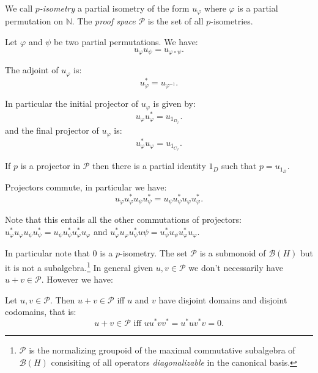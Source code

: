 \begin{definition}
We call \emph{$p$-isometry} a partial isometry of the form $u_\varphi$ where $\varphi$ is a partial permutation on $\mathbb{N}$. The \emph{proof space} $\mathcal{P}$ is the set of all $p$-isometries.
\end{definition}

\begin{proposition}
Let $\varphi$ and $\psi$ be two partial permutations. We have:
\begin{equation*}
u_\varphi u_\psi = u_{\varphi\circ\psi}.
\end{equation*}

The adjoint of $u_\varphi$ is:
\begin{equation*}
u_\varphi^* = u_{\varphi^{-1}}.
\end{equation*}

In particular the initial projector of $u_{\varphi}$ is given by:
\begin{equation*}
u_\varphi u^*_\varphi = u_{1_{D_\varphi}}.
\end{equation*}
and the final projector of $u_\varphi$ is:
\begin{equation*}
u^*_\varphi u_\varphi = u_{1_{C_\varphi}}.
\end{equation*}

If $p$ is a projector in $\mathcal{P}$ then there is a partial identity $1_D$ such that $p= u_{1_D}$.

Projectors commute, in particular we have:
\begin{equation*}
u_\varphi u_\varphi^*u_\psi u_\psi^* = u_\psi u_\psi^*u_\varphi u_\varphi^*.
\end{equation*}
\end{proposition}

Note that this entails all the other commutations of projectors:
\(u^*_\varphi u_\varphi u_\psi u^*_\psi = u_\psi u^*_\psi u^*_\varphi u_\varphi\)
and
\(u^*_\varphi u_\varphi u^*_\psi u\psi = u^*_\psi u_\psi u^*_\varphi u_\varphi\).

In particular note that \(0\) is a \(p\)-isometry. The set
\(\mathcal{P}\) is a submonoid of \(\mathcal{B}(H)\) but it is not a
subalgebra.\footnote{\(\mathcal{P}\) is the normalizing groupoid of the
  maximal commutative subalgebra of \(\mathcal{B}(H)\) consisiting of
  all operators \emph{diagonalizable} in the canonical basis.}
In general given \(u,v\in\mathcal{P}\) we don't necessarily have
\(u+v\in\mathcal{P}\). However we have:

\begin{proposition}
Let $u, v\in\mathcal{P}$. Then $u+v\in\mathcal{P}$ iff $u$ and $v$ have disjoint domains and disjoint codomains, that is:
\begin{equation*}
u+v\in\mathcal{P}\text{ iff }uu^*vv^* = u^*uv^*v = 0.
\end{equation*}
\end{proposition}

